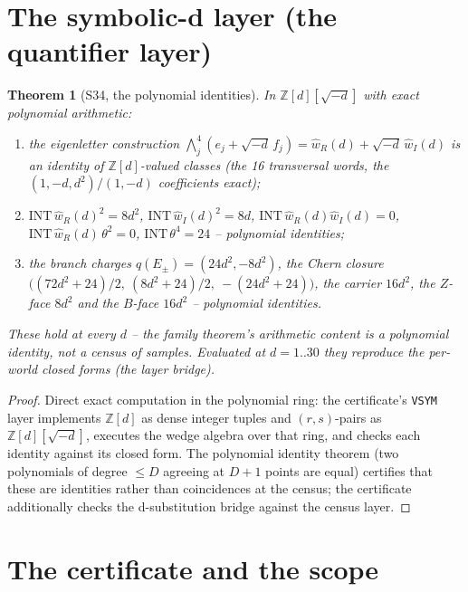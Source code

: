 \documentclass[11pt]{article}
\newtheorem{theorem}{Theorem}[section]
\begin{document}
\section{The symbolic-d layer (the quantifier layer)}

\begin{theorem}[S34, the polynomial identities]\label{thm:s34}
In $\mathbb{Z}[d][\sqrt{-d}]$ with exact polynomial arithmetic:
\begin{enumerate}
\item[(i)] the eigenletter construction
$\bigwedge^4_j(e_j + \sqrt{-d}\,f_j) = \hat w_R(d) + \sqrt{-d}\,\hat w_I(d)$
is an identity of $\mathbb{Z}[d]$-valued classes (the 16 transversal
words, the $(1,-d,d^2)/(1,-d)$ coefficients exact);
\item[(ii)] $\mathrm{INT}\,\hat w_R(d)^2 = 8d^2$,
$\mathrm{INT}\,\hat w_I(d)^2 = 8d$,
$\mathrm{INT}\,\hat w_R(d)\hat w_I(d) = 0$,
$\mathrm{INT}\,\hat w_R(d)\,\theta^2 = 0$,
$\mathrm{INT}\,\theta^4 = 24$ -- polynomial identities;
\item[(iii)] the branch charges $q(E_\pm) = (24d^2, -8d^2)$, the Chern
closure $\big((72d^2+24)/2,\ (8d^2+24)/2,\ -(24d^2+24)\big)$, the carrier
$16d^2$, the $Z$-face $8d^2$ and the $B$-face $16d^2$ -- polynomial
identities.
\end{enumerate}
These hold at \emph{every} $d$ -- the family theorem's arithmetic content
is a polynomial identity, not a census of samples. Evaluated at
$d = 1..30$ they reproduce the per-world closed forms (the layer bridge).
\end{theorem}

\begin{proof}
Direct exact computation in the polynomial ring: the certificate's
\texttt{VSYM} layer implements $\mathbb{Z}[d]$ as dense integer tuples
and $(r, s)$-pairs as $\mathbb{Z}[d][\sqrt{-d}]$, executes the wedge
algebra over that ring, and checks each identity against its closed form.
The polynomial identity theorem (two polynomials of degree $\leq D$
agreeing at $D+1$ points are equal) certifies that these are identities
rather than coincidences at the census; the certificate additionally
checks the d-substitution bridge against the census layer.
\end{proof}

\section{The certificate and the scope}
\end{document}

